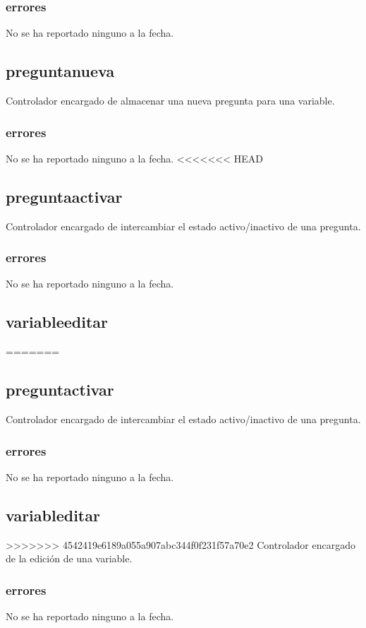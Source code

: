 \documentclass[10pt,a4paper]{book}
\begin{document}
	\subsubsection{errores}
	No se ha reportado ninguno a la fecha.

	\subsection{preguntanueva}
	Controlador encargado de almacenar una nueva pregunta para una variable.
	\subsubsection{errores}
	No se ha reportado ninguno a la fecha.
<<<<<<< HEAD

	\subsection{preguntaactivar}
	Controlador encargado de intercambiar el estado activo/inactivo de una pregunta.
	\subsubsection{errores}
	No se ha reportado ninguno a la fecha.

	\subsection{variableeditar}
=======
	
	\subsection{preguntactivar}
	Controlador encargado de intercambiar el estado activo/inactivo de una pregunta.
	\subsubsection{errores}
	No se ha reportado ninguno a la fecha.
	
	\subsection{variableditar}
>>>>>>> 4542419e6189a055a907abc344f0f231f57a70e2
	Controlador encargado de la edición de una variable.
	\subsubsection{errores}
	No se ha reportado ninguno a la fecha.
\end{document}
